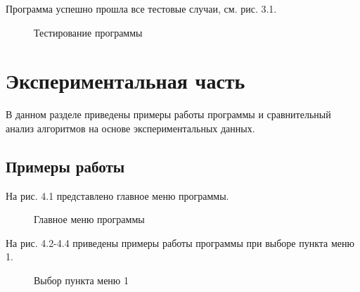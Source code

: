 \documentclass[12pt]{report}
\begin{document}
Программа успешно прошла все тестовые случаи, см. рис. 3.1. 

\begin{figure}[h]
	\caption{Тестирование программы}
	\label{figure:image}
\end{figure}

\chapter{Экспериментальная часть}

В данном разделе приведены примеры работы программы и сравнительный анализ алгоритмов на основе экспериментальных данных. 

\section{Примеры работы} 
 
На рис. 4.1 представлено главное меню программы. 

\begin{figure}[h]
	\caption{Главное меню программы}
	\label{figure:image}
\end{figure}

\newpage
На рис. 4.2-4.4 приведены примеры работы программы при выборе пункта меню 1.

\begin{figure}[h]
	\caption{Выбор пункта меню 1}
	\label{figure:image}
\end{figure}
\end{document}
